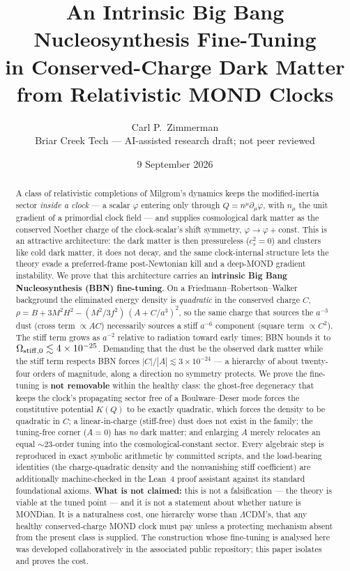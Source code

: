 \documentclass[11pt,letterpaper]{article}
\title{An Intrinsic Big Bang Nucleosynthesis Fine-Tuning\\ in Conserved-Charge Dark Matter\\ from Relativistic MOND Clocks}
\author{Carl P.\ Zimmerman\\ \small Briar Creek Tech --- AI-assisted research draft; not peer reviewed}
\date{9 September 2026}
\begin{document}
\maketitle

\begin{abstract}
A class of relativistic completions of Milgrom's dynamics keeps the modified-inertia sector \emph{inside a
clock} --- a scalar $\varphi$ entering only through $Q=n^\mu\partial_\mu\varphi$, with $n_\mu$ the unit
gradient of a primordial clock field --- and supplies cosmological dark matter as the conserved Noether
charge of the clock-scalar's shift symmetry, $\varphi\to\varphi+\text{const}$. This is an attractive
architecture: the dark matter is then pressureless ($c_s^2=0$) and clusters like cold dark matter, it does
not decay, and the same clock-internal structure lets the theory evade a preferred-frame post-Newtonian kill
and a deep-MOND gradient instability. We prove that this architecture carries an \textbf{intrinsic
Big Bang Nucleosynthesis (BBN) fine-tuning}. On a Friedmann--Robertson--Walker background the eliminated
energy density is \emph{quadratic} in the conserved charge $C$,
$\rho = B + 3M^2H^2 - (M^2/3f^2)\,(A+C/a^3)^2$, so the same charge that sources the $a^{-3}$ dust
(cross term $\propto AC$) necessarily sources a stiff $a^{-6}$ component (square term $\propto C^2$). The
stiff term grows as $a^{-2}$ relative to radiation toward early times; BBN bounds it to
$\Omega_{\rm stiff,0}\lesssim 4\times10^{-25}$. Demanding that the dust be the observed dark matter while the
stiff term respects BBN forces $|C|/|A|\lesssim 3\times10^{-24}$ --- a hierarchy of about twenty-four orders
of magnitude, along a direction no symmetry protects. We prove the fine-tuning is \textbf{not removable}
within the healthy class: the ghost-free degeneracy that keeps the clock's propagating sector free of a
Boulware--Deser mode forces the constitutive potential $K(Q)$ to be exactly quadratic, which forces the
density to be quadratic in $C$; a linear-in-charge (stiff-free) dust does not exist in the family; the
tuning-free corner ($A=0$) has \emph{no} dark matter; and enlarging $A$ merely relocates an equal
$\sim$23-order tuning into the cosmological-constant sector. Every algebraic step is reproduced in exact
symbolic arithmetic by committed scripts, and the load-bearing identities (the charge-quadratic density and
the nonvanishing stiff coefficient) are additionally machine-checked in the Lean~4 proof assistant against
its standard foundational axioms. \textbf{What is not claimed:} this is not a falsification --- the theory is
viable at the tuned point --- and it is not a statement about whether nature is MONDian. It is a naturalness
cost, one hierarchy worse than $\Lambda$CDM's, that any healthy conserved-charge MOND clock must pay unless a
protecting mechanism absent from the present class is supplied. The construction whose fine-tuning is
analysed here was developed collaboratively in the associated public repository; this paper isolates and
proves the cost.
\end{abstract}
\end{document}
